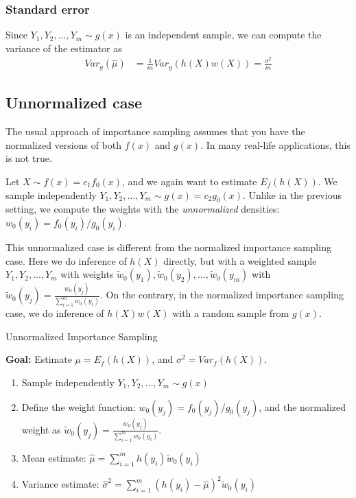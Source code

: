 \documentclass[conference]{IEEEtran}
\newtheorem{myProposition}{Proposition}
\begin{document}
\subsubsection*{Standard error}
Since $Y_1,Y_2,...,Y_m \sim g(x)$ is an independent sample, we can
compute the variance of the estimator as
\begin{align*}
Var_g(\hat{\mu}) &= \frac{1}{m} Var_g(h(X)w(X)) = \frac{\sigma^2}{m}
\end{align*}

\subsection*{Unnormalized case}
The usual approach of importance sampling assumes that you have the
normalized versions of both $f(x)$ and $g(x)$. In many real-life
applications, this is not true.

Let $X \sim f(x) = c_1 f_0(x)$, and we again want to estimate
$E_f(h(X))$. We sample independently $Y_1,Y_2,...,Y_m \sim g(x) = c_2
g_0(x)$.
Unlike in the previous setting, we compute the weights with the
\textit{unnormalized} densities: $w_0(y_i) = f_0(y_i) / g_0(y_i)$.


This unnormalized case is different from the normalized importance
sampling case. Here we do inference of $h(X)$ directly, but
with a weighted sample $Y_1,Y_2,...,Y_m$ with weights
$\tilde{w}_0(y_1),\tilde{w}_0(y_2),...,\tilde{w}_0(y_m)$ with
$\tilde{w}_0(y_j) = \frac{w_0(y_j)}{\sum_{i=1}^m w_0(y_i)}.$ On the
contrary, in the normalized importance sampling case, we do inference
of $h(X)w(X)$ with a random sample from $g(x)$.

\begin{algorithm}
\caption{Unnormalized Importance Sampling}
\textbf{Goal:} Estimate $\mu = E_f(h(X))$, and $\sigma^2 = Var_f(h(X))$.
\begin{enumerate}
\item{Sample independently $Y_1,Y_2,...,Y_m \sim g(x)$}
\item{Define the weight function: $w_0(y_j) = f_0(y_j)/g_0(y_j)$, and
    the normalized weight as $\tilde{w}_0(y_j) =
    \frac{w_0(y_j)}{\sum_{i=1}^m w_0(y_i)}.$}
\item{Mean estimate: $\hat{\mu} = \sum_{i=1}^m
    h(y_i)\tilde{w}_0(y_i)$}
\item{Variance estimate: $\hat{\sigma}^2 = \sum_{i=1}^m
    (h(y_i) - \hat{\mu})^2 \tilde{w}_0(y_i)$}
\end{enumerate}
\end{algorithm}
\end{document}

